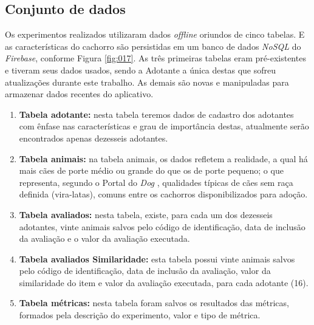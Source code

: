\documentclass[portuguese]{textolivre}
\begin{document}
\subsection{Conjunto de dados}

Os experimentos realizados utilizaram dados \emph{offline} oriundos de cinco tabelas. E as características do cachorro são persistidas em um banco de dados \textit{NoSQL} do \textit{Firebase}, conforme Figura \ref{fig:017}. As três primeiras tabelas eram pré-existentes e tiveram seus dados usados, sendo a Adotante a única destas que sofreu atualizações durante este trabalho. As demais são novas e manipuladas para armazenar dados recentes do aplicativo.

\begin{enumerate}
    \item \textbf{Tabela adotante:} nesta tabela teremos dados de cadastro dos adotantes com ênfase nas características e grau de importância destas, atualmente serão encontrados apenas dezesseis adotantes.
     \item \textbf{Tabela animais:} na tabela animais, os dados refletem a realidade, a qual há mais cães de porte médio ou grande do que os de porte pequeno; o que representa, segundo o Portal do \textit{Dog} \cite{portalDog}, qualidades típicas de cães sem raça definida (vira-latas), comuns entre os cachorros disponibilizados para adoção.
     \item \textbf{Tabela avaliados:} nesta tabela, existe, para cada um dos dezesseis adotantes, vinte animais salvos pelo código de identificação, data de inclusão da avaliação e o valor da avaliação executada.
     \item \textbf{Tabela avaliados Similaridade:} esta tabela possui vinte animais salvos pelo código de identificação, data de inclusão da avaliação, valor da similaridade do item e valor da avaliação executada, para cada adotante (16). 
     \item \textbf{Tabela métricas:} nesta tabela foram salvos os resultados das métricas, formados pela descrição do experimento, valor e tipo de métrica.
\end{enumerate}
\end{document}
